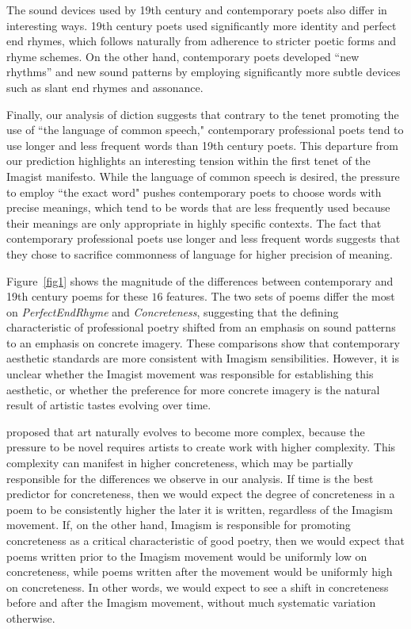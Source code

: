 \documentclass{book}
\begin{document}
The sound devices used by 19th century and contemporary poets also differ in interesting ways. 19th century poets used significantly more identity and perfect end rhymes, which follows naturally from adherence to stricter poetic forms and rhyme schemes. On the other hand, contemporary poets developed ``new rhythms'' and new sound patterns by employing significantly more subtle devices such as slant end rhymes and assonance.

Finally, our analysis of diction suggests that contrary to the tenet promoting the use of ``the language of common speech," contemporary professional poets tend to use longer and less frequent words than 19th century poets. This departure from our prediction highlights an interesting tension within the first tenet of the Imagist manifesto. While the language of common speech is desired, the pressure to employ ``the exact word" pushes contemporary poets to choose words with precise meanings, which tend to be words that are less frequently used because their meanings are only appropriate in highly specific contexts. The fact that contemporary professional poets use longer and less frequent words suggests that they chose to sacrifice commonness of language for higher precision of meaning.

Figure~\ref{fig1} shows the magnitude of the differences  between contemporary and 19th century poems for these $16$ features. The two sets of poems differ the most on \emph{PerfectEndRhyme} and \emph{Concreteness}, suggesting that the defining characteristic of professional poetry shifted from an emphasis on sound patterns to an emphasis on concrete imagery. These comparisons show that contemporary aesthetic standards are more consistent with Imagism sensibilities. However, it is unclear whether the Imagist movement was responsible for establishing this aesthetic, or whether the preference for more concrete imagery is the natural result of artistic tastes evolving over time. 

\cite{martindale1990clockwork} proposed that art naturally evolves to become more complex, because the pressure to be novel requires artists to create work with higher complexity. %
This complexity can manifest in higher concreteness, which may be partially responsible for the differences we observe in our analysis. If time is the best predictor for concreteness, then we would expect the degree of concreteness in a poem to be consistently higher the later it is written, regardless of the Imagism movement. If, on the other hand, Imagism is responsible for promoting concreteness as a critical characteristic of good poetry, then we would expect that poems written prior to the Imagism movement would be uniformly low on concreteness, while poems written after the movement would be uniformly high on concreteness. In other words, we would expect to see a shift in concreteness before and after the Imagism movement, without much systematic variation otherwise.
\end{document}
